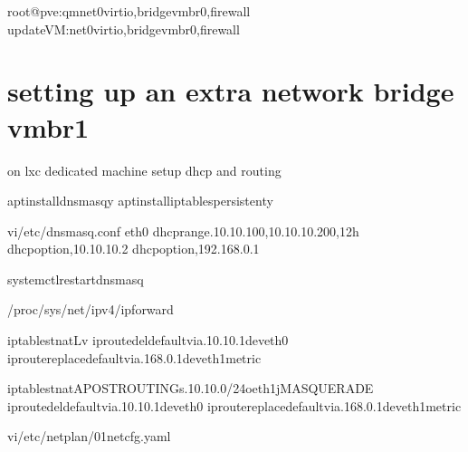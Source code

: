 \documentclass[letterpaper,10pt,english]{sphinxmanual}
\begin{document}
\begin{sphinxVerbatim}[commandchars=\\\{\}]
root@pve:\PYGZti{}\PYGZsh{}qm\PYGZhy{}net0virtio,bridgevmbr0,firewall
updateVM:\PYGZhy{}net0virtio,bridgevmbr0,firewall
\end{sphinxVerbatim}


\section{setting up an extra network bridge vmbr1}
\label{\detokenize{cluster:setting-up-an-extra-network-bridge-vmbr1}}
\sphinxAtStartPar
on lxc dedicated machine setup dhcp and routing

\begin{sphinxVerbatim}[commandchars=\\\{\}]
aptinstalldnsmasq\PYGZhy{}y
aptinstalliptables\PYGZhy{}persistent\PYGZhy{}y

vi/etc/dnsmasq.conf
eth0
dhcp\PYGZhy{}range.10.10.100,10.10.10.200,12h
dhcp\PYGZhy{}option,10.10.10.2
dhcp\PYGZhy{}option,192.168.0.1

systemctlrestartdnsmasq

\PYGZgt{}/proc/sys/net/ipv4/ip\PYGZus{}forward

iptables\PYGZhy{}tnat\PYGZhy{}L\PYGZhy{}v
iproutedeldefaultvia.10.10.1deveth0
iproutereplacedefaultvia.168.0.1deveth1metric

iptables\PYGZhy{}tnat\PYGZhy{}APOSTROUTING\PYGZhy{}s.10.10.0/24\PYGZhy{}oeth1\PYGZhy{}jMASQUERADE
iproutedeldefaultvia.10.10.1deveth0
iproutereplacedefaultvia.168.0.1deveth1metric



vi/etc/netplan/01\PYGZhy{}netcfg.yaml
\end{sphinxVerbatim}
\end{document}
